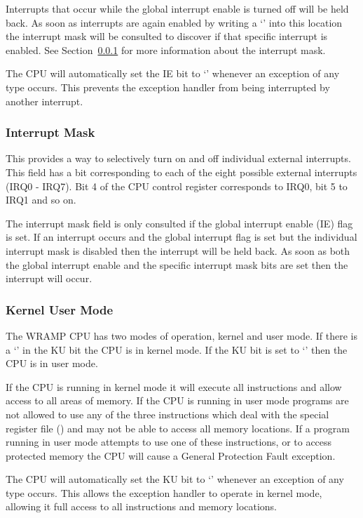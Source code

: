 Interrupts that occur while the global interrupt enable is turned off
will be held back. As soon as interrupts are again enabled by writing
a `' into this location the interrupt mask will be consulted
to discover if that specific interrupt is enabled. See
Section~\ref{sec:imask} for more information about the interrupt mask.

The CPU will automatically set the IE bit to `' whenever an
exception of any type occurs. This prevents the exception handler
from being interrupted by another interrupt.

\subsubsection{Interrupt Mask}
\label{sec:imask}

This provides a way to selectively turn on and off individual external
interrupts. This field has a bit corresponding to each of the eight
possible external interrupts (IRQ0 - IRQ7). Bit 4 of the CPU control
register corresponds to IRQ0, bit 5 to IRQ1 and so on.

The interrupt mask field is only consulted if the global interrupt
enable (IE) flag is set. If an interrupt occurs and the global
interrupt flag is set but the individual interrupt mask is disabled
then the interrupt will be held back. As soon as both the global
interrupt enable and the specific interrupt mask bits are set then the
interrupt will occur.

\subsubsection{Kernel User Mode}

The WRAMP CPU has two modes of operation, kernel and user mode. If
there is a `' in the KU bit the CPU is in kernel mode. If
the KU bit is set to `' then the CPU is in user mode. 

If the CPU is running in kernel mode it will execute all instructions and
allow access to all areas of memory. If the CPU is running in user
mode programs are not allowed to use any of the three instructions
which deal with the special register file ()
and may not be able to access all memory locations. If a program
running in user mode attempts to use one of these instructions, or to
access protected memory the CPU will cause a General Protection Fault
exception.

The CPU will automatically set the KU bit to `' whenever an
exception of any type occurs. This allows the exception handler to
operate in kernel mode, allowing it full access to all instructions
and memory locations.

